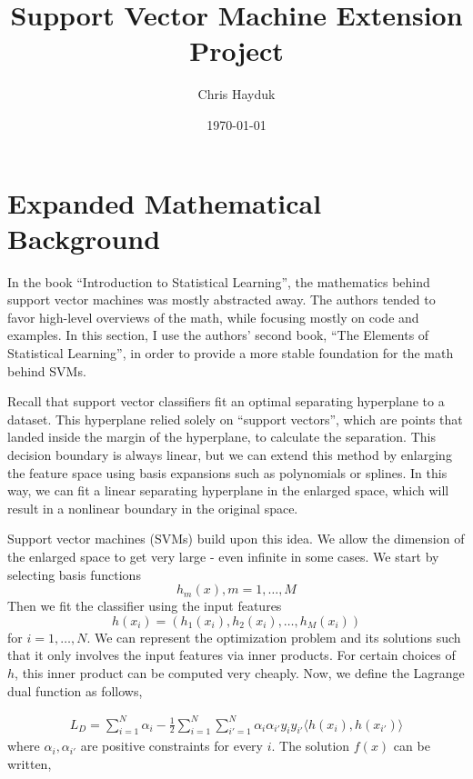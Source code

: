 \documentclass[12pt]{article}\usepackage[]{graphicx}\usepackage[]{color}
\begin{document}
\title{Support Vector Machine Extension Project}

\author{Chris Hayduk}
\date{\today}

\maketitle



\section{Expanded Mathematical Background}

In the book ``Introduction to Statistical Learning'', the mathematics behind support vector machines was mostly abstracted away. The authors tended to favor high-level overviews of the math, while focusing mostly on code and examples. In this section, I use the authors' second book, ``The Elements of Statistical Learning'', in order to provide a more stable foundation for the math behind SVMs.

Recall that support vector classifiers fit an optimal separating hyperplane to a dataset. This hyperplane relied solely on ``support vectors'', which are points that landed inside the margin of the hyperplane, to calculate the separation. This decision boundary is always linear, but we can extend this method by enlarging the feature space using basis expansions such as polynomials or splines. In this way, we can fit a linear separating hyperplane in the enlarged space, which will result in a nonlinear boundary in the original space.

Support vector machines (SVMs) build upon this idea. We allow the dimension of the enlarged space to get very large - even infinite in some cases. We start by selecting basis functions $$h_m(x) , m = 1, \ldots, M$$ Then we fit the classifier using the input features $$h(x_i) = (h_1(x_i), h_2(x_i), \ldots, h_M(x_i))$$ for $i = 1, \ldots, N$. We can represent the optimization problem and its solutions such that it only involves the input features via inner products. For certain choices of $h$, this inner product can be computed very cheaply. Now, we define the Lagrange dual function as follows,

\begin{align}
L_D = \sum_{i=1}^N \alpha_i - \frac{1}{2} \sum_{i=1}^N \sum_{i'=1}^N \alpha_i \alpha_{i'} y_i y_{i'} \langle h(x_i), h(x_{i'}) \rangle
\end{align}
where $\alpha_i, \alpha_{i'}$ are positive constraints for every $i$. The solution $f(x)$ can be written, 
\end{document}
